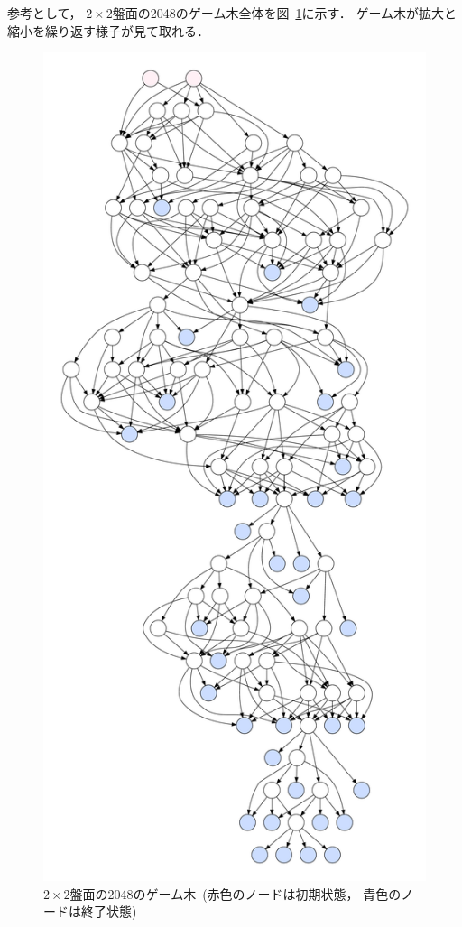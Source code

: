 参考として， $2\times2$盤面の2048のゲーム木全体を図~\ref{fig:game_tree}に示す．
ゲーム木が拡大と縮小を繰り返す様子が見て取れる．
\begin{figure}[t]
    \centering
    \includegraphics[width=0.7\linewidth{}]{figures/tree.pdf}
    \caption{$2\times2$盤面の2048のゲーム木~(赤色のノードは初期状態， 青色のノードは終了状態)}
    \label{fig:game_tree}
\end{figure}